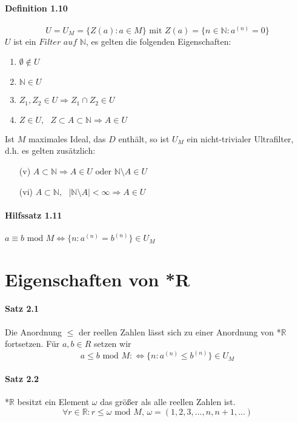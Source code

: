 \documentclass[a4paper]{article}
\begin{document}
\paragraph{Definition 1.10}  
$$ U = U_M = \{Z(a): a \in M\} \text{ mit } Z(a) = \{n \in \mathbb{N}: a^{(n)} = 0\} $$
$U $ ist ein $\textit{Filter auf } \mathbb{N} $, es gelten die folgenden Eigenschaften: 
\begin{enumerate}
      \item $ \emptyset \notin U $      
      \item $ \mathbb{N} \in U$ 
      \item $ Z_1, Z_2 \in U \Rightarrow Z_1 \cap Z_2 \in U$ 
      \item $ Z \in U, \text{ } Z \subset A \subset \mathbb{N} \Rightarrow A \in U$ 

\end{enumerate}
Ist $ M $ maximales Ideal, das $ D $ enthält, so ist $ U_M $ ein nicht-trivialer Ultrafilter, 
d.h. es gelten zusätzlich:
\begin{enumerate}
      \item[(v)] $ A \subset  \mathbb{N} \Rightarrow A \in U \text{ oder } \mathbb{N} \setminus A \in U$ 
      \item[(vi)] $ A \subset  \mathbb{N}, \text{ } |\mathbb{N} \setminus A| < \infty \Rightarrow A \in U$ 
\end{enumerate}

\paragraph{Hilfssatz 1.11} $a \equiv b \text{ mod } M \iff \{n: a^{(n)} = b^{(n)}\} \in U_M$



\section{Eigenschaften von *R}

\paragraph{Satz 2.1} Die Anordnung $\leqslant$ der reellen Zahlen lässt 
sich zu einer Anordnung von *$\mathbb{R}$ fortsetzen. Für $ a,b \in R $ setzen wir
$$ a \leqslant b \text{ mod } M :\iff \{n: a^{(n)} \leqslant b^{(n)}\} \in U_M $$ 


\paragraph{Satz 2.2} *$\mathbb{R}$ besitzt ein Element $ \omega $ das größer als alle reellen Zahlen ist. 
$$ \forall r \in \mathbb{R} : r \leqslant \omega \text{ mod } M \text{, } \omega = (1,2,3,...,n,n+1,...) $$
\end{document}
